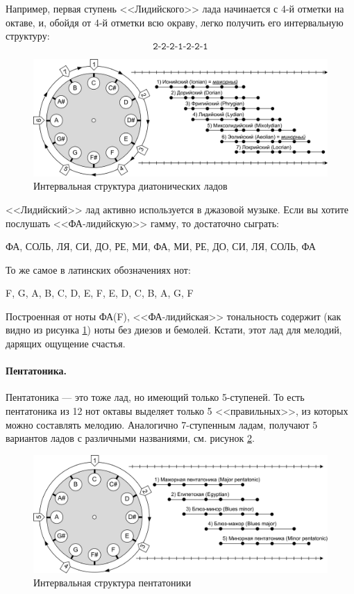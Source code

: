 Например, первая ступень <<Лидийского>> лада начинается с 4-й отметки на октаве, и, обойдя от 4-й отметки всю окраву, легко получить его интервальную структуру:
\[
    \texttt{2-2-2-1-2-2-1}
\]

\begin{figure}[!ht]
    \centering
    \includegraphics[width=\textwidth]{fig/intervals/modes} 
    \caption{Интервальная структура диатонических ладов}\label{fig:harmony:lad:modes}
\end{figure} 

<<Лидийский>> лад активно используется в джазовой музыке. Если вы хотите послушать <<ФА-лидийскую>> гамму, то достаточно сыграть:
\begin{center}
    ФА, СОЛЬ, ЛЯ, СИ, ДО, РЕ, МИ, ФА, МИ, РЕ, ДО, СИ, ЛЯ, СОЛЬ, ФА
\end{center}

То же самое в латинских обозначениях нот:
\begin{center}
    F, G, A, B, C, D, E, F, E, D, C, B, A, G, F
\end{center}
 
Построенная от ноты ФА(F), <<ФА-лидийская>> тональность содержит (как видно из рисунка \ref{fig:harmony:lad:modes}) ноты без диезов и бемолей. Кстати, этот лад для мелодий, дарящих ощущение счастья.


\paragraph{Пентатоника.} Пентатоника --- это тоже лад, но имеющий только 5-ступеней. То есть пентатоника из 12 нот октавы выделяет только 5 <<правильных>>, из которых можно составлять мелодию. Аналогично 7-ступенным ладам, получают 5 вариантов ладов с различными названиями, см. рисунок \ref{fig:harmony:lad:pentatonic}.

\begin{figure}[!ht]
    \centering
    \includegraphics[width=\textwidth]{fig/intervals/pentatonic} 
    \caption{Интервальная структура пентатоники}\label{fig:harmony:lad:pentatonic}
\end{figure} 

